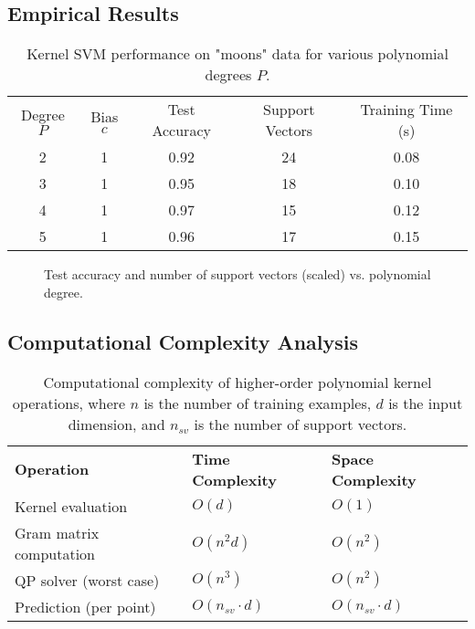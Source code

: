 \documentclass[11pt]{article}
\begin{document}
\subsection{Empirical Results}
\begin{table}[h]
  \centering
  \begin{tabular}{ccccc}
    Degree $P$ & Bias $c$ & Test Accuracy & Support Vectors & Training Time (s) \\
    2 & 1 & 0.92 & 24 & 0.08 \\
    3 & 1 & 0.95 & 18 & 0.10 \\
    4 & 1 & 0.97 & 15 & 0.12 \\
    5 & 1 & 0.96 & 17 & 0.15 \\
  \end{tabular}
  \caption{Kernel SVM performance on "moons" data for various polynomial degrees $P$.}
\end{table}

\begin{figure}[h]
\centering
{}
\caption{Test accuracy and number of support vectors (scaled) vs. polynomial degree.}
\end{figure}

\subsection{Computational Complexity Analysis}
\begin{table}[h]
  \centering
  \begin{tabular}{lll}
    \textbf{Operation} & \textbf{Time Complexity} & \textbf{Space Complexity} \\
    Kernel evaluation & $O(d)$ & $O(1)$ \\
    Gram matrix computation & $O(n^2d)$ & $O(n^2)$ \\
    QP solver (worst case) & $O(n^3)$ & $O(n^2)$ \\
    Prediction (per point) & $O(n_{sv} \cdot d)$ & $O(n_{sv} \cdot d)$ \\
  \end{tabular}
  \caption{Computational complexity of higher-order polynomial kernel operations, where $n$ is the number of training examples, $d$ is the input dimension, and $n_{sv}$ is the number of support vectors.}
\end{table}
\end{document}
